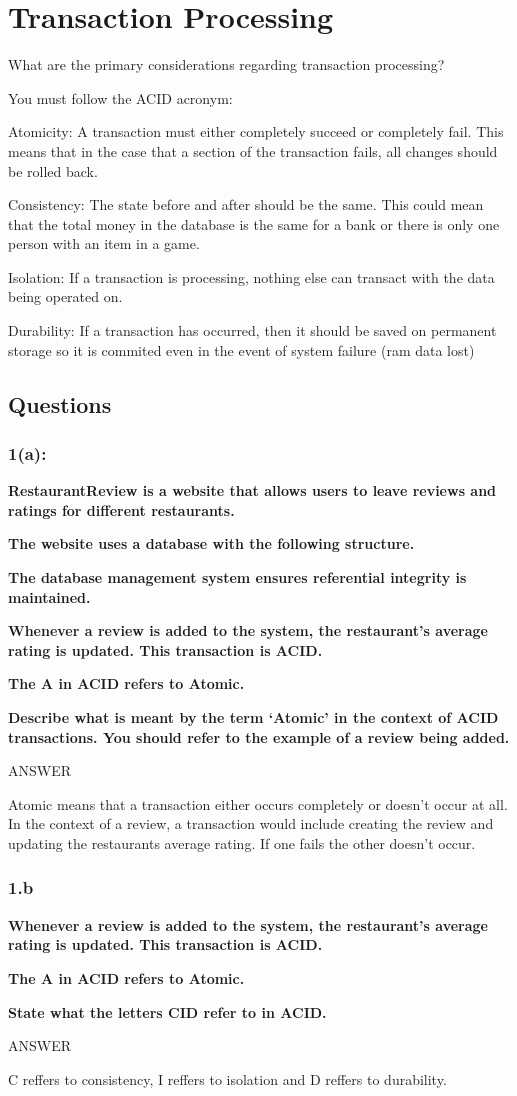 \documentclass{article}
\begin{document}
\section{Transaction Processing}
\huge
What are the primary considerations regarding 
transaction processing?

\large
You must follow the ACID acronym:

Atomicity: A transaction must either completely succeed or 
completely fail. This means that in the case that a section
of the transaction fails, all changes should be rolled back.

Consistency: The state before and after should be the same.
This could mean that the total money in the database is the 
same for a bank or there is only one person with an item in 
a game.

Isolation: If a transaction is processing, nothing else
can transact with the data being operated on.

Durability: If a transaction has occurred, then it should be 
saved on permanent storage so it is commited even in the event
of system failure (ram data lost)

\subsection{Questions}
\subsubsection{1(a):}
\textbf{RestaurantReview is a website that allows users to 
leave reviews and ratings for different restaurants.}

\textbf{The website uses a database with the following structure.}

\textbf{The database management system ensures referential 
integrity is maintained.}

\textbf{Whenever a review is added to the system, the 
restaurant’s average rating is updated. This transaction 
is ACID.}

\textbf{The A in ACID refers to Atomic.}

\textbf{Describe what is meant by the term ‘Atomic’ in the 
context of ACID transactions. You should refer to the 
example of a review being added.}

ANSWER

Atomic means that a transaction either occurs completely
or doesn't occur at all. In the context of a review, a 
transaction would include creating the review and updating
the restaurants average rating. If one fails the other doesn't
occur.

\subsubsection{1.b}
\textbf{
Whenever a review is added to the system, the restaurant’s average rating is updated. This transaction is ACID.}

\textbf{
The A in ACID refers to Atomic.}

\textbf{
State what the letters CID refer to in ACID.}

ANSWER

C reffers to consistency, I reffers to isolation and D reffers
to durability.
\end{document}
